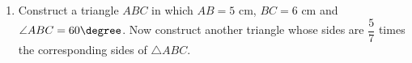 \begin{enumerate}
\item Construct a triangle $ABC$ in which $AB = 5$ cm, $BC = 6$ cm and $\angle ABC = 60\degree$. Now construct another triangle whose sides are $\dfrac{5}{7}$ times the corresponding sides of $\triangle ABC$.
\end{enumerate}
